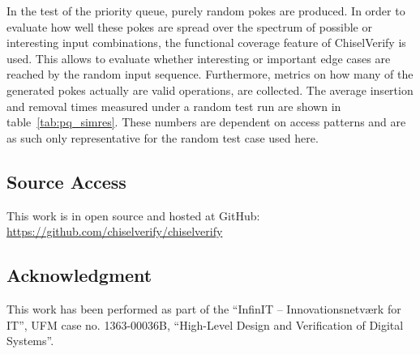 \documentclass[conference]{IEEEtran}
\begin{document}
In the test of the priority queue, purely random pokes are produced. In order to evaluate how well these pokes are spread over the spectrum 
of possible or interesting input combinations, the functional coverage feature of ChiselVerify is used. This allows to evaluate whether interesting 
or important edge cases are reached by the random input sequence. Furthermore, metrics on how many of the generated pokes actually are valid 
operations, are collected. The average insertion and removal times measured under a random test run are shown in table~\ref{tab:pq_simres}.
These numbers are dependent on access patterns and are as such only representative for the random test case used here.

\subsection*{Source Access}

This work is in open source and hosted at GitHub: \url{https://github.com/chiselverify/chiselverify}

\subsection*{Acknowledgment}

This work has been performed as part of the
``InfinIT -- Innovationsnetv{\ae}rk for IT'', UFM case no. 1363-00036B,
``High-Level Design and Verification of Digital Systems''.



\end{document}
